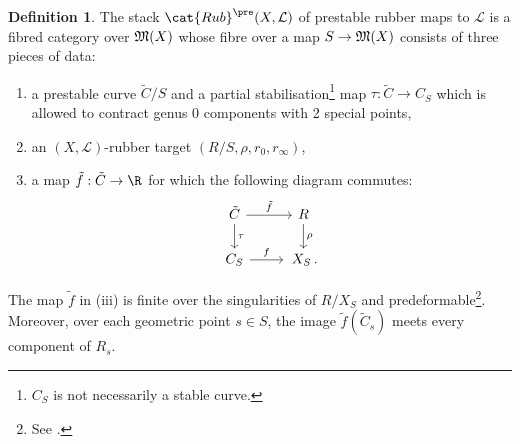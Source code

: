 \documentclass[a4paper,12pt]{article} %
\newcommand{\bb}[1]{{\mathbb{#1}}}
\newcommand{\ca}[1]{{\mathcal{#1}}}
\theoremstyle{definition}
\newtheorem{definition}{Definition} %
\theoremstyle{plain}%
\begin{document}
\begin{definition}\label{def:prestable_rubber_maps}
The stack $\cat{Rub}^{\pre}(X, \ca L)$ of prestable rubber maps to $\ca L$ is a fibred category over $\frak M(X)$ whose fibre over a map $S \to \frak M(X)$ consists of 
three pieces of data: 
\begin{enumerate}
\item[(i)]
a prestable curve $\tilde C /S$ and a partial
stabilisation{\footnote{$C_S$ is not
necessarily a stable curve.}}
map $\tau\colon \tilde C \to C_S$ which is allowed to contract
genus 0 components with 2 special points,
\item[(ii)] an $(X,\ca L)$-rubber target $(R/S,\rho,r_0,r_\infty)$,


 

\item[(iii)] a map $\tilde{f}: \tilde C \to \R$ for which 
the following diagram commutes: 
\begin{equation}
\begin{tikzcd}
\tilde C \arrow[r,"\tilde{f}"] \arrow[d,"\tau"] & R \arrow[d, "\rho"]\\
C_S \arrow[r, "f"] & \, X_S\, .
\end{tikzcd}
\end{equation}
\end{enumerate}
The map $\tilde{f}$ in (iii) is finite over the singularities of $R/X_S$ and
predeformable{\footnote{See \cite{Li2001-Stable}.}}.
Moreover, over each geometric point $s\in S$, the image $\tilde{f}(\tilde{C}_s)$
meets
every component of $R_s$.

\end{definition}
\end{document}
